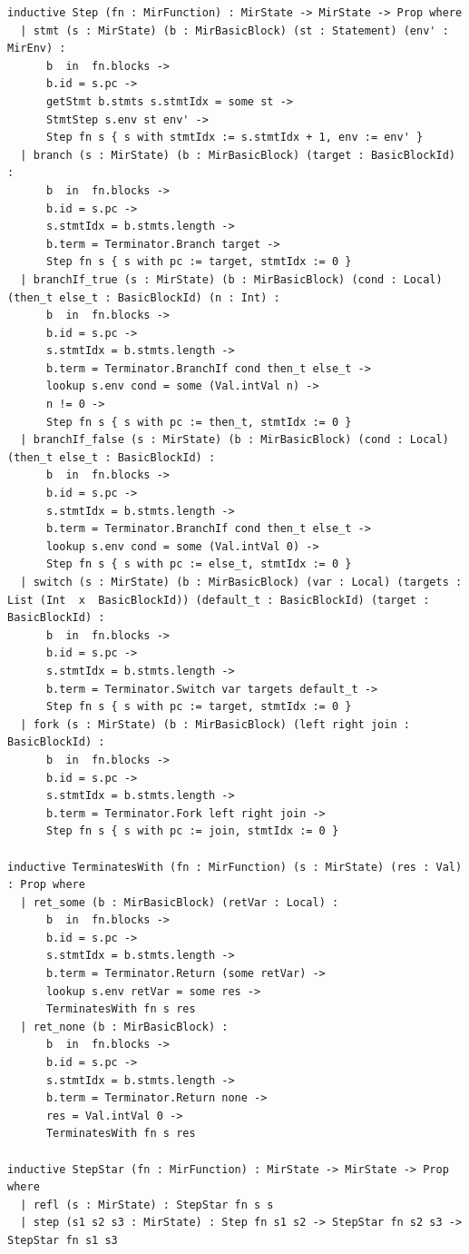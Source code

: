 \begin{lstlisting}[language=Lean4, caption={Complete Formal Operational Semantics Mechanization in Lean 4 (\texttt{lean/Supercompiler/Semantics.lean}).}, label={lst:semantics_lean_verbatim}]
inductive Step (fn : MirFunction) : MirState -> MirState -> Prop where
  | stmt (s : MirState) (b : MirBasicBlock) (st : Statement) (env' : MirEnv) :
      b  in  fn.blocks ->
      b.id = s.pc ->
      getStmt b.stmts s.stmtIdx = some st ->
      StmtStep s.env st env' ->
      Step fn s { s with stmtIdx := s.stmtIdx + 1, env := env' }
  | branch (s : MirState) (b : MirBasicBlock) (target : BasicBlockId) :
      b  in  fn.blocks ->
      b.id = s.pc ->
      s.stmtIdx = b.stmts.length ->
      b.term = Terminator.Branch target ->
      Step fn s { s with pc := target, stmtIdx := 0 }
  | branchIf_true (s : MirState) (b : MirBasicBlock) (cond : Local) (then_t else_t : BasicBlockId) (n : Int) :
      b  in  fn.blocks ->
      b.id = s.pc ->
      s.stmtIdx = b.stmts.length ->
      b.term = Terminator.BranchIf cond then_t else_t ->
      lookup s.env cond = some (Val.intVal n) ->
      n != 0 ->
      Step fn s { s with pc := then_t, stmtIdx := 0 }
  | branchIf_false (s : MirState) (b : MirBasicBlock) (cond : Local) (then_t else_t : BasicBlockId) :
      b  in  fn.blocks ->
      b.id = s.pc ->
      s.stmtIdx = b.stmts.length ->
      b.term = Terminator.BranchIf cond then_t else_t ->
      lookup s.env cond = some (Val.intVal 0) ->
      Step fn s { s with pc := else_t, stmtIdx := 0 }
  | switch (s : MirState) (b : MirBasicBlock) (var : Local) (targets : List (Int  x  BasicBlockId)) (default_t : BasicBlockId) (target : BasicBlockId) :
      b  in  fn.blocks ->
      b.id = s.pc ->
      s.stmtIdx = b.stmts.length ->
      b.term = Terminator.Switch var targets default_t ->
      Step fn s { s with pc := target, stmtIdx := 0 }
  | fork (s : MirState) (b : MirBasicBlock) (left right join : BasicBlockId) :
      b  in  fn.blocks ->
      b.id = s.pc ->
      s.stmtIdx = b.stmts.length ->
      b.term = Terminator.Fork left right join ->
      Step fn s { s with pc := join, stmtIdx := 0 }

inductive TerminatesWith (fn : MirFunction) (s : MirState) (res : Val) : Prop where
  | ret_some (b : MirBasicBlock) (retVar : Local) :
      b  in  fn.blocks ->
      b.id = s.pc ->
      s.stmtIdx = b.stmts.length ->
      b.term = Terminator.Return (some retVar) ->
      lookup s.env retVar = some res ->
      TerminatesWith fn s res
  | ret_none (b : MirBasicBlock) :
      b  in  fn.blocks ->
      b.id = s.pc ->
      s.stmtIdx = b.stmts.length ->
      b.term = Terminator.Return none ->
      res = Val.intVal 0 ->
      TerminatesWith fn s res

inductive StepStar (fn : MirFunction) : MirState -> MirState -> Prop where
  | refl (s : MirState) : StepStar fn s s
  | step (s1 s2 s3 : MirState) : Step fn s1 s2 -> StepStar fn s2 s3 -> StepStar fn s1 s3


\end{lstlisting}
